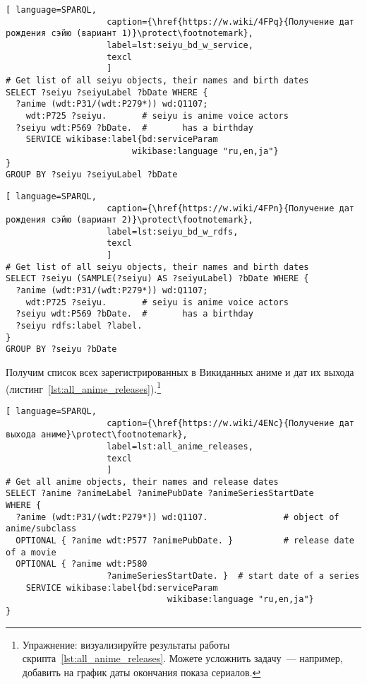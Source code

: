 \begin{lstlisting}[ language=SPARQL, 
                    caption={\href{https://w.wiki/4FPq}{Получение дат рождения сэйю (вариант 1)}\protect\footnotemark},
                    label=lst:seiyu_bd_w_service,
                    texcl 
                    ]
# Get list of all seiyu objects, their names and birth dates
SELECT ?seiyu ?seiyuLabel ?bDate WHERE {
  ?anime (wdt:P31/(wdt:P279*)) wd:Q1107;
    wdt:P725 ?seiyu.       # seiyu is anime voice actors
  ?seiyu wdt:P569 ?bDate.  #       has a birthday
    SERVICE wikibase:label{bd:serviceParam
					     wikibase:language "ru,en,ja"}
}
GROUP BY ?seiyu ?seiyuLabel ?bDate
\end{lstlisting}%

\begin{lstlisting}[ language=SPARQL, 
                    caption={\href{https://w.wiki/4FPn}{Получение дат рождения сэйю (вариант 2)}\protect\footnotemark},
                    label=lst:seiyu_bd_w_rdfs,
                    texcl 
                    ]
# Get list of all seiyu objects, their names and birth dates
SELECT ?seiyu (SAMPLE(?seiyu) AS ?seiyuLabel) ?bDate WHERE {
  ?anime (wdt:P31/(wdt:P279*)) wd:Q1107;
    wdt:P725 ?seiyu.       # seiyu is anime voice actors
  ?seiyu wdt:P569 ?bDate.  #       has a birthday 
  ?seiyu rdfs:label ?label.
}
GROUP BY ?seiyu ?bDate
\end{lstlisting}%

Получим список всех зарегистрированных в Викиданных аниме и дат их выхода (листинг~\protect\ref{lst:all_anime_releases}).\footnote{Упражнение: визуализируйте результаты работы скрипта~\protect\ref{lst:all_anime_releases}. Можете усложнить задачу~--- например, добавить на график даты окончания показа сериалов.} 

\begin{lstlisting}[ language=SPARQL, 
                    caption={\href{https://w.wiki/4ENc}{Получение дат выхода аниме}\protect\footnotemark},
                    label=lst:all_anime_releases,
                    texcl 
                    ]
# Get all anime objects, their names and release dates
SELECT ?anime ?animeLabel ?animePubDate ?animeSeriesStartDate
WHERE {
  ?anime (wdt:P31/(wdt:P279*)) wd:Q1107.               # object of anime/subclass
  OPTIONAL { ?anime wdt:P577 ?animePubDate. }          # release date of a movie
  OPTIONAL { ?anime wdt:P580
					?animeSeriesStartDate. }  # start date of a series
    SERVICE wikibase:label{bd:serviceParam
					     		wikibase:language "ru,en,ja"}
}
\end{lstlisting}%

